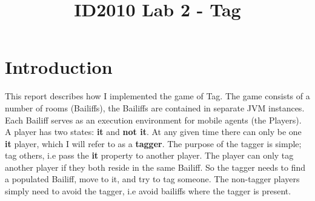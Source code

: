 \documentclass[conference, a4paper]{IEEEtran}
\begin{document}
\title{ID2010 Lab 2 - Tag}


\author{
}
\maketitle

\IEEEpeerreviewmaketitle


\section{Introduction}
This report describes how I implemented the game of Tag. The game consists of a number of rooms (Bailiffs), the Bailiffs are contained in separate JVM instances. Each Bailiff serves as an execution environment for mobile agents (the Players). A player has two states: \textbf{it} and \textbf{not it}. At any given time there can only be one \textbf{it} player, which I will refer to as a \textbf{tagger}. The purpose of the tagger is simple; tag others, i.e pass the \textbf{it} property to another player. The player can only tag another player if they both reside in the same Bailiff. So the tagger needs to find a populated Bailiff, move to it, and try to tag someone. The non-tagger players simply need to avoid the tagger, i.e avoid bailiffs where the tagger is present.
\end{document}

